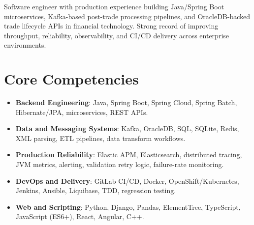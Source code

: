 \documentclass[11pt,a4paper,sans]{moderncv}
\begin{document}
\makecvtitle


\vspace{6pt}
\small{Software engineer with production experience building Java/Spring Boot microservices, Kafka-based post-trade processing pipelines, and OracleDB-backed trade lifecycle APIs in financial technology. Strong record of improving throughput, reliability, observability, and CI/CD delivery across enterprise environments.}


\section{Core Competencies}
\vspace{1pt}
\begin{itemize}

\item \textbf{Backend Engineering}: Java, Spring Boot, Spring Cloud, Spring Batch, Hibernate/JPA, microservices, REST APIs.

\item \textbf{Data and Messaging Systems}: Kafka, OracleDB, SQL, SQLite, Redis, XML parsing, ETL pipelines, data transform workflows.

\item \textbf{Production Reliability}: Elastic APM, Elasticsearch, distributed tracing, JVM metrics, alerting, validation retry logic, failure-rate monitoring.

\item \textbf{DevOps and Delivery}: GitLab CI/CD, Docker, OpenShift/Kubernetes, Jenkins, Ansible, Liquibase, TDD, regression testing.

\item \textbf{Web and Scripting}: Python, Django, Pandas, ElementTree, TypeScript, JavaScript (ES6+), React, Angular, C++.

\end{itemize}

\end{document}
